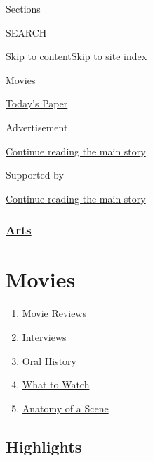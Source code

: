 Sections

SEARCH

\protect\hyperlink{site-content}{Skip to
content}\protect\hyperlink{site-index}{Skip to site index}

\href{https://www.nytimes.com/section/movies}{Movies}

\href{https://myaccount.nytimes.com/auth/login?response_type=cookie\&client_id=vi}{}

\href{https://www.nytimes.com/section/todayspaper}{Today's Paper}

Advertisement

\protect\hyperlink{after-top}{Continue reading the main story}

Supported by

\protect\hyperlink{after-sponsor}{Continue reading the main story}

\hypertarget{arts}{%
\subsubsection{\texorpdfstring{\href{arts}{Arts}}{Arts}}\label{arts}}

\hypertarget{movies}{%
\section{Movies}\label{movies}}

\begin{enumerate}
\def\labelenumi{\arabic{enumi}.}
\tightlist
\item
  \href{/reviews/movies}{Movie Reviews}
\item
  \href{/spotlight/interviews}{Interviews}
\item
  \href{/spotlight/oral-history}{Oral History}
\item
  \href{/spotlight/what-to-watch}{What to Watch}
\item
  \href{/column/anatomy-of-a-scene}{Anatomy of a Scene}
\end{enumerate}

\hypertarget{highlights}{%
\subsection{Highlights}\label{highlights}}

